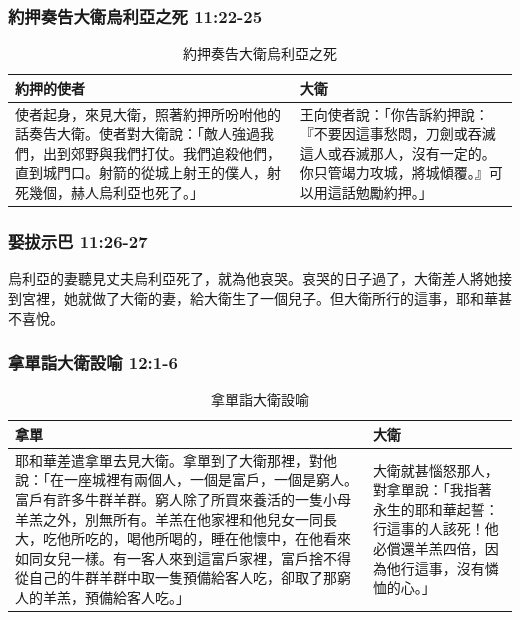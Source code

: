 \subsubsection{約押奏告大衛烏利亞之死 11:22-25}
\begin{table}[H]
\hspace*{-7mm}
\centering 
\begin{tabular}{p{10.5cm}|p{7.5cm}}\hline\hline
約押的使者&大衛\\\hline
使者起身，來見大衛，照著約押所吩咐他的話奏告大衛。使者對大衛說：「敵人強過我們，出到郊野與我們打仗。我們追殺他們，直到城門口。射箭的從城上射王的僕人，射死幾個，赫人烏利亞也死了。」&王向使者說：「你告訴約押說：『不要因這事愁悶，刀劍或吞滅這人或吞滅那人，沒有一定的。你只管竭力攻城，將城傾覆。』可以用這話勉勵約押。」\\\hline
\end{tabular}
\caption{約押奏告大衛烏利亞之死}
\end{table}


\subsubsection{娶拔示巴 11:26-27}
烏利亞的妻聽見丈夫烏利亞死了，就為他哀哭。哀哭的日子過了，大衛差人將她接到宮裡，她就做了大衛的妻，給大衛生了一個兒子。但大衛所行的這事，耶和華甚不喜悅。

\subsubsection{拿單詣大衛設喻 12:1-6}
\begin{table}[H]
\hspace*{-7mm}
\centering 
\begin{tabular}{p{}|p{}}\hline\hline
拿單&大衛\\\hline
耶和華差遣拿單去見大衛。拿單到了大衛那裡，對他說：「在一座城裡有兩個人，一個是富戶，一個是窮人。富戶有許多牛群羊群。窮人除了所買來養活的一隻小母羊羔之外，別無所有。羊羔在他家裡和他兒女一同長大，吃他所吃的，喝他所喝的，睡在他懷中，在他看來如同女兒一樣。有一客人來到這富戶家裡，富戶捨不得從自己的牛群羊群中取一隻預備給客人吃，卻取了那窮人的羊羔，預備給客人吃。」 &大衛就甚惱怒那人，對拿單說：「我指著永生的耶和華起誓：行這事的人該死！他必償還羊羔四倍，因為他行這事，沒有憐恤的心。」\\\hline
\end{tabular}
\caption{拿單詣大衛設喻}
\end{table}

